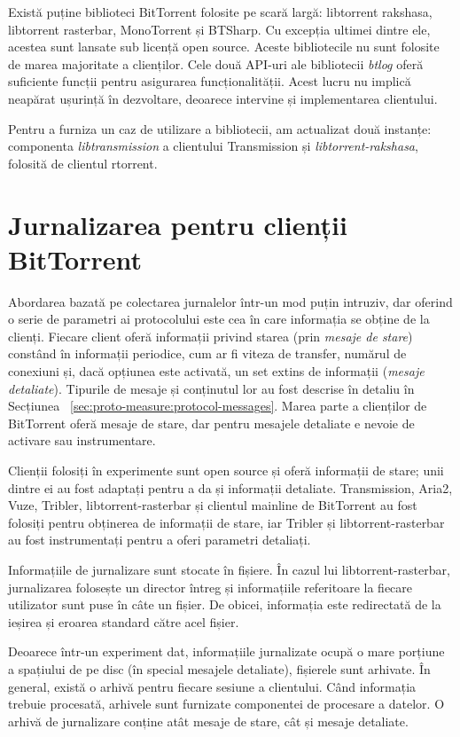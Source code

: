 Există puține biblioteci BitTorrent folosite pe scară largă:
libtorrent rakshasa, libtorrent rasterbar, MonoTorrent și BTSharp.
Cu excepția ultimei dintre ele, acestea sunt lansate sub licență open source.
Aceste bibliotecile nu sunt folosite de marea majoritate a clienților. Cele două
API-uri ale bibliotecii \textit{btlog} oferă suficiente funcții pentru
asigurarea funcționalității. Acest lucru nu implică neapărat ușurință în
dezvoltare, deoarece intervine și implementarea clientului.

Pentru a furniza un caz de utilizare a bibliotecii, am actualizat două
instanțe: componenta \textit{libtransmission} a clientului Transmission
și \textit{libtorrent-rakshasa}, folosită de clientul rtorrent.

\section{Jurnalizarea pentru clienții BitTorrent}
\label{sec:proto-measure:log-collect}

Abordarea bazată pe colectarea jurnalelor într-un mod puțin intruziv, dar
oferind o serie de parametri ai protocolului este cea în care informația se
obține de la clienți. Fiecare client oferă informații privind starea
(prin \textit{mesaje de stare}) constând în informații periodice, cum ar
fi viteza de transfer, numărul de conexiuni și, dacă opțiunea este activată,
un set extins de informații (\textit{mesaje detaliate}). Tipurile de mesaje și
conținutul lor au fost descrise în detaliu în Secțiunea ~\ref{sec:proto-measure:protocol-messages}. Marea parte a clienților de BitTorrent oferă mesaje de
stare, dar pentru mesajele detaliate e nevoie de activare sau instrumentare.

Clienții folosiți în experimente sunt open source și oferă informații de
stare; unii dintre ei au fost adaptați pentru a da și informații detaliate.
Transmission, Aria2, Vuze, Tribler, libtorrent-rasterbar și clientul mainline
de BitTorrent au fost folosiți pentru obținerea de informații de stare, iar
Tribler și libtorrent-rasterbar au fost instrumentați pentru a oferi
parametri detaliați.

Informațiile de jurnalizare sunt stocate în fișiere. În cazul lui
libtorrent-rasterbar, jurnalizarea folosește un director întreg și
informațiile referitoare la fiecare utilizator sunt puse în câte un fișier.
De obicei, informația este redirectată de la ieșirea și eroarea standard
către acel fișier.

Deoarece într-un experiment dat, informațiile jurnalizate ocupă o mare porțiune
a spațiului de pe disc (în special mesajele detaliate), fișierele sunt
arhivate. În general, există o arhivă pentru fiecare sesiune a clientului. Când
informația trebuie procesată, arhivele sunt furnizate componentei de procesare
a datelor. O arhivă de jurnalizare conține atât mesaje de stare, cât și
mesaje detaliate.

